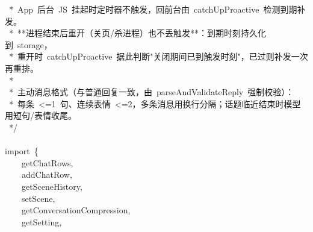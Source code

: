 \documentclass[a4paper,10pt]{article}
\begin{document}
{~*~App~后台~JS~挂起时定时器不触发，回前台由~catchUpProactive~检测到期补发。\\
~*~**进程结束后重开（关页/杀进程）也不丢触发**：到期时刻持久化到~storage，\\
~*~重开时~catchUpProactive~据此判断"关闭期间已到触发时刻"，已过则补发一次再重排。\\
~*\\
~*~主动消息格式（与普通回复一致，由~parseAndValidateReply~强制校验）：\\
~*~每条~<=1~句、连续表情~<=2，多条消息用换行分隔；话题临近结束时模型用短句/表情收尾。\\
~*/\\
\mbox{}\\
import~\{\\
~~~~getChatRows,\\
~~~~addChatRow,\\
~~~~getSceneHistory,\\
~~~~setScene,\\
~~~~getConversationCompression,\\
~~~~getSetting,
}

\newpage
\end{document}
